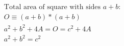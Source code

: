 \documentclass[preview]{standalone}
\begin{document}
\begin{align*}
\text{Total area of square with sides $a + b$:} \\ O \equiv (a+b) * (a+b) \\ a^2 + b^2 + 4A = O = c^2 + 4A \\ a^2 + b^2 = c^2
\end{align*}
\end{document}
